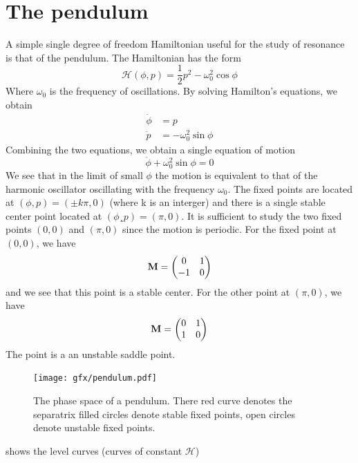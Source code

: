 \section{The pendulum}
\label{sec:pendulum}
A simple single degree of freedom Hamiltonian useful for the study
of resonance is that of the pendulum. The Hamiltonian has the form
\begin{equation}
    \mathcal{H}(\phi,p)= \frac{1}{2} p^2 -\omega_0^2\cos\phi
\end{equation}
Where $\omega_0$ is the frequency of oscillations. By solving 
Hamilton's equations, we obtain
\begin{align}
    \dot{\phi} &= p\\
    \dot{p} &= - \omega_0^2\sin\phi
\end{align}
Combining the two equations, we obtain a single equation of motion
\begin{equation}
    \ddot{\phi}+\omega_0^2\sin\phi =0
\end{equation}
We see that in the limit of small $\phi$ the motion is equivalent to
that of the harmonic oscillator oscillating with the frequency
$\omega_0$. The fixed points are located at
$(\phi, p)=(\pm k\pi,0)$ (where k is an interger) and there is 
a single 
stable center point located at $(\phi¸ p)=(\pi, 0)$. It is 
sufficient to study the two fixed points $(0,0)$ and $(\pi,0)$
since the motion is periodic. For the fixed point at $(0,0)$, we have
\begin{equation}
    \boldsymbol{\mathbf{M}}=
    \begin{pmatrix}
        0 & 1\\
        -1 & 0
    \end{pmatrix}
\end{equation}
and we see that this point is a stable center. For the other point 
at $(\pi,0)$, we have
\begin{equation}
    \boldsymbol{\mathbf{M}}=
    \begin{pmatrix}
        0 & 1\\
        1 & 0
    \end{pmatrix}
\end{equation}
The point is a an unstable saddle point.
\begin{figure}[htb]
\centering
\texttt{[image: gfx/pendulum.pdf]}
\caption{The phase space of a pendulum. There red curve denotes the 
    separatrix filled circles denote stable fixed points, open circles denote
    unstable fixed points.}
\label{fig:pendulum}
\end{figure}
 shows the level curves (curves of constant $\mathcal{H}$)
